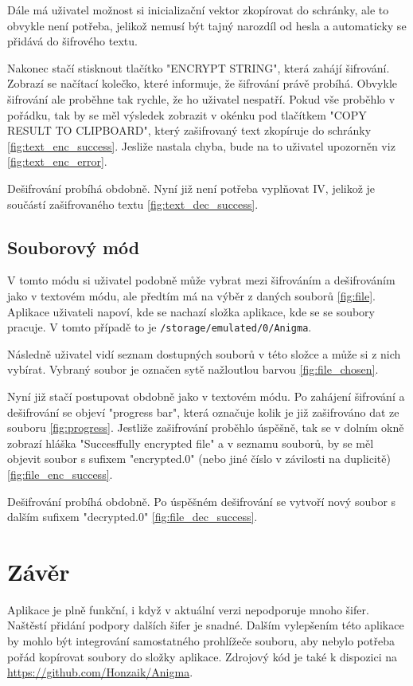 \documentclass[12pt, a4paper]{article}
\begin{document}
Dále má uživatel možnost si inicializační vektor zkopírovat do schránky, ale to obvykle není potřeba, jelikož nemusí být tajný narozdíl od hesla a automaticky se přidává do šifrového textu.

Nakonec stačí stisknout tlačítko "ENCRYPT STRING", která zahájí šifrování. Zobrazí se načítací kolečko, které informuje, že šifrování právě probíhá. Obvykle šifrování ale proběhne tak rychle, že ho uživatel nespatří. Pokud vše proběhlo v pořádku, tak by se měl výsledek zobrazit v okénku pod tlačítkem "COPY RESULT TO CLIPBOARD", který zašifrovaný text zkopíruje do schránky \ref{fig:text_enc_success}. Jesliže nastala chyba, bude na to uživatel upozorněn viz \ref{fig:text_enc_error}.

Dešifrování probíhá obdobně. Nyní již není potřeba vyplňovat IV, jelikož je součástí zašifrovaného textu \ref{fig:text_dec_success}.

\subsection{Souborový mód}
V tomto módu si uživatel podobně může vybrat mezi šifrováním a dešifrováním jako v textovém módu, ale předtím má na výběr z daných souborů \ref{fig:file}. Aplikace uživateli napoví, kde se nachazí složka aplikace, kde se se soubory pracuje. V tomto případě to je \texttt{/storage/emulated/0/Anigma}.

Následně uživatel vidí seznam dostupných souborů v této složce a může si z nich vybírat. Vybraný soubor je označen sytě nažloutlou barvou \ref{fig:file_chosen}.

Nyní již stačí postupovat obdobně jako v textovém módu. Po zahájení šifrování a dešifrování se objeví "progress bar", která označuje kolik je již zašifrováno dat ze souboru \ref{fig:progress}. Jestliže zašifrování proběhlo úspěšně, tak se v dolním okně zobrazí hláška "Succesffully encrypted file" a v seznamu souborů, by se měl objevit soubor s sufixem "encrypted.0" (nebo jiné číslo v závilosti na duplicitě) \ref{fig:file_enc_success}.

Dešifrování probíhá obdobně. Po úspěšném dešifrování se vytvoří nový soubor s dalším sufixem "decrypted.0" \ref{fig:file_dec_success}.

\section{Závěr}
Aplikace je plně funkční, i když v aktuální verzi nepodporuje mnoho šifer. Naštěstí přidání podpory dalších šifer je snadné. Dalším vylepšením této aplikace by mohlo být integrování samostatného prohlížeče souboru, aby nebylo potřeba pořád kopírovat soubory do složky aplikace. Zdrojový kód je také k dispozici na \url{https://github.com/Honzaik/Anigma}.
\end{document}
